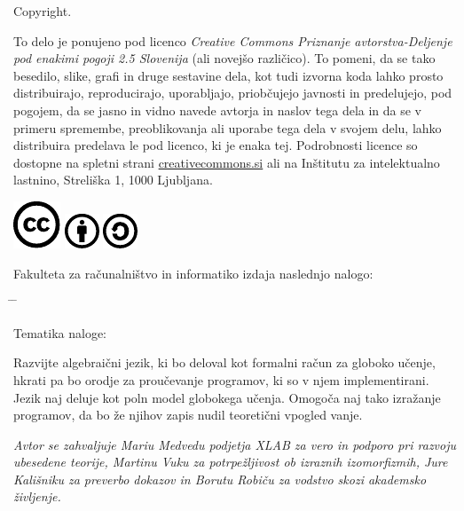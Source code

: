 \documentclass[a4paper, 12pt]{book}
\newcommand{\clearemptydoublepage}{\newpage{\pagestyle{empty}\cleardoublepage}}
\newcommand{\CcImageCc}[1]{%
	\includegraphics[scale=#1]{license/cc_cc_30.pdf}%
}
\newcommand{\CcImageBy}[1]{%
	\includegraphics[scale=#1]{license/cc_by_30.pdf}%
}
\newcommand{\CcImageSa}[1]{%
	\includegraphics[scale=#1]{license/cc_sa_30.pdf}%
}
\begin{document}
\noindent
{\sc Copyright}. 
{\small \noindent
To delo je ponujeno pod licenco \textit{Creative Commons Priznanje avtorstva-Deljenje pod enakimi pogoji 2.5 Slovenija} (ali novej\v so razli\v cico).
To pomeni, da se tako besedilo, slike, grafi in druge sestavine dela, kot tudi izvorna koda lahko prosto distribuirajo,
reproducirajo, uporabljajo, priobčujejo javnosti in predelujejo, pod pogojem, da se jasno in vidno navede avtorja in naslov tega
dela in da se v primeru spremembe, preoblikovanja ali uporabe tega dela v svojem delu, lahko distribuira predelava le pod
licenco, ki je enaka tej.
Podrobnosti licence so dostopne na spletni strani \href{http://creativecommons.si}{creativecommons.si} ali na Inštitutu za
intelektualno lastnino, Streliška 1, 1000 Ljubljana.

\begin{center}%
\CcImageCc{0.741573033707865}\hspace*{1ex}\CcImageBy{1}\hspace*{1ex}\CcImageSa{1}%
\end{center}
}

\clearemptydoublepage

\thispagestyle{empty}
\vspace*{4cm}

\noindent
Fakulteta za računalništvo in informatiko izdaja naslednjo nalogo:
\medskip
\begin{tabbing}
\hspace{32mm}\= \hspace{6cm} \= \kill




Tematika naloge:
\end{tabbing}
Razvijte algebraični jezik, ki bo deloval kot formalni račun za globoko učenje, hkrati pa bo orodje za proučevanje programov, ki so v njem implementirani. Jezik naj deluje kot poln model globokega učenja. Omogoča naj tako izražanje programov, da bo že njihov zapis nudil teoretični vpogled vanje.
\vspace{15mm}






\vspace{2cm}

\clearemptydoublepage

\thispagestyle{empty}\mbox{}\vfill\null\it%
\noindent
Avtor se zahvaljuje Mariu Medvedu podjetja XLAB za vero in podporo pri razvoju ubesedene teorije, Martinu Vuku za potrpežljivost ob izraznih izomorfizmih, Jure Kališniku za preverbo dokazov in Borutu Robiču za vodstvo skozi akademsko življenje.
\rm\normalfont
\end{document}

